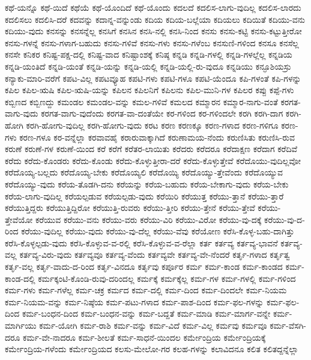 {ಕಥೆ-ಯನ್ನೊ
ಕಥೆ-ಯಿದೆ
ಕಥೆಯೆ
ಕಥೆ-ಯೊಂದಿದೆ
ಕಥೆ-ಯೊಂದು
ಕದಲದೆ
ಕದಲಿಸ-ಲಾಗು-ವುದಿಲ್ಲ
ಕದಲಿಸ-ಲಾರದು
ಕದಲಿಸಲು
ಕದಲಿಸಿ-ದರೆ
ಕದವನ್ನು
ಕದಾನ್ನ-ವನ್ನುಂಡು
ಕದಿಯ
ಕದಿಯ-ಬಲ್ಲೆಯಾ
ಕದಿಯಲು
ಕದಿಯಿತೆ
ಕದಿಯು-ವನು
ಕದಿಯು-ವುದು
ಕನಸನ್ನು
ಕನಸನ್ನೆಲ್ಲ
ಕನಸಿಗೆ
ಕನಸಿನ
ಕನಸಿ-ನಲ್ಲಿ
ಕನಸಿ-ನಿಂದ
ಕನಸು
ಕನಸು-ಕಟ್ಟಿ
ಕನಸು-ಕಟ್ಟುತ್ತೀರೋ
ಕನಸು-ಗಳನ್ನೆ
ಕನಸು-ಗಳಾಗ-ಬಹುದು
ಕನಸು-ಗಳಿವೆ
ಕನಸು-ಗಳು
ಕನಸು-ಗಳೆಂಬ
ಕನಸುಣಿ-ಗಳಿಂದ
ಕನಸೂ
ಕನಸೆಲ್ಲ
ಕನಸೇ
ಕನಿಕರ
ಕನಿಷ್ಟ-ಪಕ್ಷ-ದಲ್ಲಿ
ಕನಿಷ್ಟ-ವಾದ
ಕನಿಷ್ಟಾಂಶಕ್ಕೆ
ಕನಿಷ್ಠ
ಕನ್ನಡಿ
ಕನ್ನಡಿ-ಗಳಲ್ಲಿ
ಕನ್ನಡಿ-ಗಳಲ್ಲೆಲ್ಲ
ಕನ್ನಡಿಯ
ಕನ್ನಡಿ-ಯಂತಿದೆ
ಕನ್ನಡಿ-ಯಂತೆ
ಕನ್ನಡಿ-ಯನ್ನು
ಕನ್ನಡಿ-ಯಲ್ಲಿ
ಕನ್ನಡಿ-ಯಲ್ಲಿ-ರು-ವುದೂ
ಕನ್ನಡಿಯು
ಕನ್ಫೂಶಿಯಸ್ರು
ಕನ್ಯಾಕು-ಮಾರಿ-ವರೆಗೆ
ಕಪಟ-ವಿಲ್ಲ
ಕಪಟವ್ಯೂಹ
ಕಪಟಿ-ಗಳು
ಕಪಟಿ-ಗಳೂ
ಕಪಟಿ-ಯೆಂದೂ
ಕಪಿ-ಗಳಂತೆ
ಕಪಿ-ಗಳನ್ನು
ಕಪಿಲ
ಕಪಿಲ-ಋಷಿ
ಕಪಿಲ-ಋಷಿ-ಯನ್ನು
ಕಪಿಲನ
ಕಪಿಲನಿಗೆ
ಕಪಿಲನು
ಕಪಿಲ-ಮುನಿ-ಗಳ
ಕಪಿಲರ
ಕಪ್ಪು
ಕಪ್ಪೆ-ಗಳು
ಕಬ್ಬಿಣದ
ಕಬ್ಬಿಣದ್ದು
ಕಮಂಡಲ
ಕಮಂಡಲ-ವನ್ನು
ಕಮಲ-ಗಳಿವೆ
ಕಮಲದ
ಕಮ್ಮಾರನ
ಕಮ್ಮಾರ-ನಾಗು-ವಂತೆ
ಕರಗತ-ವಾಗು-ವುದು
ಕರಗತ-ವಾಗು-ವುದೆಂದು
ಕರಗತ-ವಾ-ದಂತೆಯೇ
ಕರ-ಗಳಿಂದ
ಕರ-ಗಳಿಂದಲೇ
ಕರಗಿ
ಕರಗಿ-ದಾಗ
ಕರಗಿ-ಹೋಗಿ
ಕರಗಿ-ಹೋಗು-ವುದಿಲ್ಲ
ಕರಗಿ-ಹೋಗು-ವುದು
ಕರಟ
ಕರಣ
ಕರಣಕ್ಕೂ
ಕರಣ-ಗಳಾದ
ಕರಣ-ಗಳಿಗೂ
ಕರಣ-ಗಳು
ಕರಣ-ಗಳೂ
ಕರ-ವನ್ನೆಲ್ಲಾ
ಕರವಾವಹೈ
ಕರಾರುವಾಕ್ಕಾಗಿದೆ
ಕರುಣಾಮಯ-ನೆಂದು
ಕರುಣಿಸಿತು
ಕರುಣಿಸಿ-ರುವ
ಕರುಣೆ
ಕರುಣೆ-ಗಳ
ಕರುಣೆ-ಯಿಂದ
ಕರೆ
ಕರೆಗೆ
ಕರೆತರ-ಲಾಯಿತು
ಕರೆದರು
ಕರೆದರೂ
ಕರೆದಾಕ್ಷಣ
ಕರೆದಾಗ
ಕರೆದಿವೆ
ಕರೆದು
ಕರೆದು-ಕೊಂಡರು
ಕರೆದು-ಕೊಂಡು
ಕರೆದು-ಕೊಳ್ಳುತ್ತೀರಾ-ದರೆ
ಕರೆದು-ಕೊಳ್ಳುತ್ತೇವೆ
ಕರೆದೊಯು-ವುದಿಲ್ಲವೋ
ಕರೆದೊಯ್ಯ-ಬಲ್ಲದು
ಕರೆದೊಯ್ಯ-ಬೇಕು
ಕರೆದೊಯ್ಯಲಿ
ಕರೆದೊಯ್ಯಿ
ಕರೆದೊಯ್ಯು-ತ್ತೇವೆಂದು
ಕರೆದೊಯ್ಯುವ
ಕರೆದೊಯ್ಯು-ವುದು
ಕರೆಯ-ತೊಡಗಿ-ದನು
ಕರೆಯನ್ನು
ಕರೆಯ-ಬಹುದು
ಕರೆಯ-ಬೇಕಾಗು-ವುದು
ಕರೆಯ-ಬೇಕು
ಕರೆಯ-ಲಾಗು-ವುದಿಲ್ಲ
ಕರೆಯಲ್ಪಡುವ
ಕರೆಯಲ್ಪಡು-ವುದು
ಕರೆಯಿರಿ
ಕರೆಯುತ್ತ
ಕರೆಯು-ತ್ತಾನೆ
ಕರೆಯು-ತ್ತಾರೆ
ಕರೆಯುತ್ತಿದ್ದರು
ಕರೆಯುತ್ತಿದ್ದಿರೋ
ಕರೆಯುತ್ತಿ-ರುವರು
ಕರೆಯು-ತ್ತೀರಿ
ಕರೆಯು-ತ್ತೇನೆ
ಕರೆಯು-ತ್ತೇವೆ
ಕರೆಯು-ತ್ತೇವೆಯೋ
ಕರೆಯುವ
ಕರೆಯು-ವನು
ಕರೆಯು-ವರು
ಕರೆಯು-ವಿರಿ
ಕರೆಯು-ವಿರೋ
ಕರೆಯು-ವು-ದಕ್ಕೆ
ಕರೆಯು-ವು-ದ-ರಿಂದ
ಕರೆಯು-ವುದಿಲ್ಲ
ಕರೆಯು-ವುದು
ಕರೆಯು-ವು-ದೆಲ್ಲ
ಕರೆಯು-ವೆವು
ಕರೆಯೋಣ
ಕರೆಸಿ-ಕೊಳ್ಳ-ಬಹು-ದಾಗಿತ್ತು
ಕರೆಸಿ-ಕೊಳ್ಳಲ್ಪಡು-ವುದು
ಕರೆಸಿ-ಕೊಳ್ಳುವ-ವ-ರಲ್ಲಿ
ಕರೆಸಿ-ಕೊಳ್ಳುವ-ವ-ರೆಲ್ಲಾ
ಕರ್ತ
ಕರ್ತವ್ಯ
ಕರ್ತವ್ಯ-ಭಾವನೆ
ಕರ್ತವ್ಯ-ವಲ್ಲ
ಕರ್ತವ್ಯ-ವಿರು-ವುದು
ಕರ್ತವ್ಯವೂ
ಕರ್ತವ್ಯ-ವೆಂದು
ಕರ್ತವ್ಯವೇ
ಕರ್ತವ್ಯ-ವೇ-ನೆಂದರೆ
ಕರ್ತೃ-ಗಳಾದ
ಕರ್ತೃತ್ವ
ಕರ್ತೃ-ವಲ್ಲ
ಕರ್ತೃ-ವಾದು-ದ-ರಿಂದ
ಕರ್ತೃ-ವಿನದೂ
ಕರ್ತೃವು
ಕರ್ಪೂರ
ಕರ್ಮ
ಕರ್ಮ-ಕಾಂಡ
ಕರ್ಮ-ಕಾಂಡದ
ಕರ್ಮ-ಕಾಂಡ-ದಲ್ಲಿ
ಕರ್ಮಕ್ಕಂಟಿ-ಕೊಂಡಿ-ರುವು-ದರಿಂದಲ್ಲ
ಕರ್ಮಕ್ಕೆ
ಕರ್ಮಕ್ಕೆಲ್ಲ
ಕರ್ಮ-ಗಳ
ಕರ್ಮ-ಗಳಲ್ಲಿ
ಕರ್ಮ-ಗಳಿಂದ
ಕರ್ಮ-ಗಳು
ಕರ್ಮ-ಗಳೆಲ್ಲ
ಕರ್ಮ-ಚಕ್ರ
ಕರ್ಮದ
ಕರ್ಮ-ದಲ್ಲಿ
ಕರ್ಮ-ದಿಂದ
ಕರ್ಮ-ದಿಂದಲೇ
ಕರ್ಮ-ನಿಯಮ
ಕರ್ಮ-ನಿಯಮ-ವನ್ನು
ಕರ್ಮ-ನಿಷ್ಠೆಯ
ಕರ್ಮ-ಪಟು-ಗಳಾದ
ಕರ್ಮ-ಪಾಶ-ದಿಂದ
ಕರ್ಮ-ಫಲ-ಗಳನ್ನು
ಕರ್ಮ-ಫಲ-ದಿಂದ
ಕರ್ಮ-ಬಂಧನ-ದಿಂದ
ಕರ್ಮ-ಬಂಧನ-ವನ್ನು
ಕರ್ಮ-ಬದ್ದತೆ
ಕರ್ಮ-ಮಾಡಿ
ಕರ್ಮ-ಮಾರ್ಗ-ವನ್ನೇ
ಕರ್ಮ-ಮಾರ್ಗಿಯು
ಕರ್ಮ-ಯೋಗಿ
ಕರ್ಮ-ರಾಶಿ
ಕರ್ಮ-ವನ್ನು
ಕರ್ಮ-ವಿದೆ
ಕರ್ಮ-ವಿಲ್ಲ
ಕರ್ಮವು
ಕರ್ಮವೂ
ಕರ್ಮ-ವೆಸಗಿ-ದರೂ
ಕರ್ಮ-ವೇ-ನಾದರೂ
ಕರ್ಮ-ಶೀಲತೆ
ಕರ್ಮ-ಸಾಧನೆ-ಯಿಂದಲ
ಕರ್ಮೇಂದ್ರಿಯ
ಕರ್ಮೇಂದ್ರಿಯಕ್ಕೆ
ಕರ್ಮೇಂದ್ರಿಯ-ಗಳೆಂದು
ಕರ್ಮೇಂದ್ರಿಯದ
ಕಲಸು-ಮೇಲೋ-ಗರ
ಕಲಹ-ಗಳನ್ನು
ಕಲಾವಿದನೂ
ಕಲಿತ
ಕಲಿತದ್ದನ್ನೆಲ್ಲಾ
}
